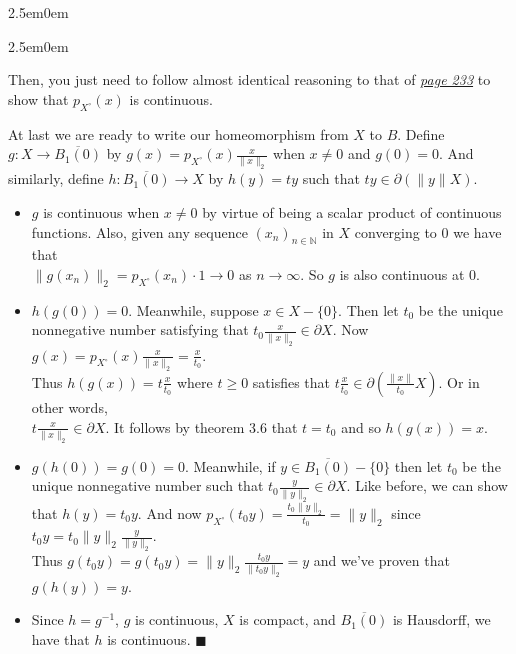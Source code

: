 \documentclass{book}
\newcommand{\inLinkRap}[2]{{\color{blue}\hyperlink{#1}{\textit{#2}}}}
\newenvironment{myIndent}{%
   \begin{adjustwidth}{2.5em}{0em}%
}{%
   \end{adjustwidth}%
}
\newcommand{\retTwo}{\hfill\bigbreak}
\begin{document}
\begin{myIndent}
\begin{myIndent}
		Then, you just need to follow almost identical reasoning to that of \inLinkRap{Minkowski functional reference}{page 233} to show that $p_{X^\circ}(x)$ is continuous.\retTwo
	\end{myIndent}

	At last we are ready to write our homeomorphism from $X$ to $B$. Define $g : X \to \overline{B_1(0)}$ by $g(x) = p_{X^\circ}(x)\frac{x}{\|x\|_2}$ when $x \neq 0$ and $g(0) = 0$. And similarly, define $h : \overline{B_1(0)} \to X$ by $h(y) = ty$ such that $ty \in \partial(\|y\|X)$.
	\begin{itemize}
		\item $g$ is continuous when $x \neq 0$ by virtue of being a scalar product of continuous\\ functions. Also, given any sequence $(x_n)_{n \in \mathbb{N}}$ in $X$ converging to $0$ we have that\\ $\|g(x_n)\|_2 = p_{X^\circ}(x_n) \cdot 1 \to 0$ as $n \to \infty$. So $g$ is also continuous at $0$.\retTwo
		
		\item $h(g(0)) = 0$. Meanwhile, suppose $x \in X - \{0\}$. Then let $t_0$ be the unique\\ [2pt] nonnegative number satisfying that $t_0 \frac{x}{\|x\|_2} \in \partial X$. Now $g(x) = p_{X^\circ}(x) \frac{x}{\|x\|_2} = \frac{x}{t_0}$.\\ [-1pt] Thus $h(g(x)) = t \frac{x}{t_0}$ where $t \geq 0$ satisfies that $t \frac{x}{t_0} \in \partial(\frac{\|x\|}{t_0}X)$. Or in other words,\\ [3pt] $t\frac{x}{\|x\|_2} \in \partial X$. It follows by theorem 3.6 that $t = t_0$ and so $h(g(x)) = x$.\retTwo
		
		\item $g(h(0)) = g(0) = 0$. Meanwhile, if $y \in \overline{B_1(0)} - \{0\}$ then let $t_0$ be the\\ unique nonnegative number such that $t_0 \frac{y}{\|y\|_2} \in \partial X$. Like before, we can show\\ that $h(y) = t_0 y$. And now $p_{X^\circ}(t_0 y) = \frac{t_0\|y\|_2}{t_0} = \|y\|_2$ since $t_0 y = t_0 \|y\|_2 \frac{y}{\|y\|_2}$.\\ Thus $g(t_0 y) = g(t_0 y) = \|y\|_2\frac{t_0y}{\|t_0y\|_2} = y$ and we've proven that $g(h(y)) = y$.\newpage
		
		\item Since $h = g^{-1}$, $g$ is continuous, $X$ is compact, and $\overline{B_1(0)}$ is Hausdorff, we have that $h$ is continuous. $\blacksquare$\retTwo
	\end{itemize}
\end{myIndent}
\end{document}
